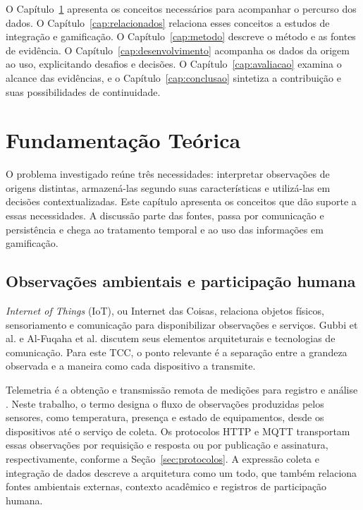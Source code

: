 \documentclass[tcc,capa]{texufpel}
\newif\ifemrevisao
\newcommand{\tintarevisao}{\ifemrevisao\color{correvisao}\fi}
\DeclareRobustCommand{\rev}[1]{{\tintarevisao #1}}
\begin{document}
O Capítulo~\ref{cap:fundamentos} apresenta os conceitos necessários para acompanhar o percurso dos dados. O Capítulo~\ref{cap:relacionados} relaciona esses conceitos a estudos de integração e gamificação. O Capítulo~\ref{cap:metodo} descreve o método e as fontes de evidência. O Capítulo~\ref{cap:desenvolvimento} acompanha os dados da origem ao uso, explicitando desafios e decisões. O Capítulo~\ref{cap:avaliacao} examina o alcance das evidências, e o Capítulo~\ref{cap:conclusao} sintetiza a contribuição e suas possibilidades de continuidade.

\chapter{Fundamentação Teórica}\label{cap:fundamentos}
O problema investigado reúne três necessidades: interpretar observações de origens distintas, armazená-las segundo suas características e utilizá-las em decisões contextualizadas. Este capítulo apresenta os conceitos que dão suporte a essas necessidades. A discussão parte das fontes, passa por comunicação e persistência e chega ao tratamento temporal e ao uso das informações em gamificação.

\section{Observações ambientais e participação humana}

\emph{Internet of Things} (IoT), ou Internet das Coisas, relaciona objetos físicos, sensoriamento e comunicação para disponibilizar observações e serviços. Gubbi et al. \cite{gubbi2013} e Al-Fuqaha et al. \cite{alfuqaha2015} discutem seus elementos arquiteturais e tecnologias de comunicação. Para este TCC, o ponto relevante é a separação entre a grandeza observada e a maneira como cada dispositivo a transmite.

Telemetria é a obtenção e transmissão remota de medições para registro e análise \cite{lozanoTelemetry2017}. Neste trabalho, o termo designa o fluxo de observações produzidas pelos sensores, como temperatura, presença e estado de equipamentos, desde os dispositivos até o serviço de coleta. \rev{Os protocolos HTTP e MQTT transportam essas observações por requisição e resposta ou por publicação e assinatura, respectivamente, conforme a Seção~\ref{sec:protocolos}.} A expressão coleta e integração de dados descreve a arquitetura como um todo, que também relaciona fontes ambientais externas, contexto acadêmico e registros de participação humana.
\end{document}
